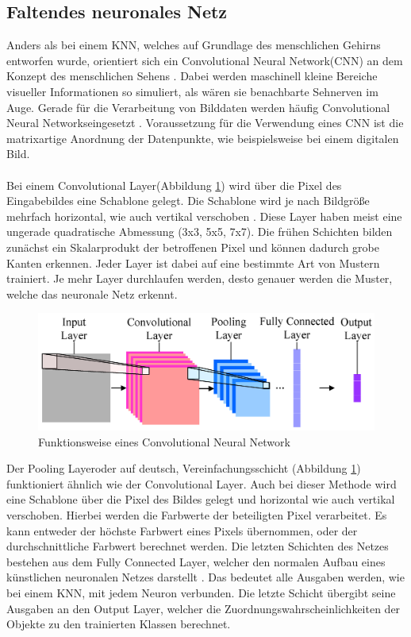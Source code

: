 \documentclass[a4paper,12pt,oneside]{article}
\begin{document}
  \subsection{Faltendes neuronales Netz}
Anders als bei einem KNN, welches auf Grundlage des menschlichen Gehirns entworfen wurde, orientiert sich ein \glqq Convolutional Neural Network\grqq (CNN) an dem Konzept des menschlichen Sehens \cite{lecun1989backpropagation}. Dabei werden maschinell kleine Bereiche visueller Informationen so simuliert, als wären sie benachbarte Sehnerven im Auge. Gerade für die Verarbeitung von Bilddaten werden häufig \glqq Convolutional Neural Networks\grqq eingesetzt \cite[326]{goodfellow2016deep}. Voraussetzung für die Verwendung eines CNN ist die matrixartige Anordnung der Datenpunkte, wie beispielsweise bei einem digitalen Bild.
\\
\\
Bei einem \glqq Convolutional Layer\grqq (Abbildung \ref{img:CNN}) wird über die Pixel des Eingabebildes eine Schablone gelegt. Die Schablone wird je nach Bildgröße mehrfach horizontal, wie auch vertikal verschoben \cite[327-335]{goodfellow2016deep}. Diese Layer haben meist eine ungerade quadratische Abmessung (3x3, 5x5, 7x7). Die frühen Schichten bilden zunächst ein Skalarprodukt der betroffenen Pixel und können dadurch grobe Kanten erkennen. Jeder Layer ist dabei auf eine bestimmte Art von Mustern trainiert. Je mehr Layer durchlaufen werden, desto genauer werden die Muster, welche das neuronale Netz erkennt.

\begin{figure}
    [h]
	\centering
	\includegraphics[scale=1.5]{Sources/cnn2.png}
		\caption{Funktionsweise eines Convolutional Neural Network\cite{info7040061}}
	\label{img:CNN}
\end{figure}

Der \glqq Pooling Layer\grqq oder auf deutsch, Vereinfachungsschicht (Abbildung \ref{img:CNN}) funktioniert ähnlich wie der \glqq Convolutional Layer\grqq \cite[336f.]{goodfellow2016deep}. Auch bei dieser Methode wird eine Schablone über die Pixel des Bildes gelegt und horizontal wie auch vertikal verschoben. Hierbei werden die Farbwerte der beteiligten Pixel verarbeitet. Es kann entweder der höchste Farbwert eines Pixels übernommen, oder der durchschnittliche Farbwert berechnet werden. Die letzten Schichten des Netzes bestehen aus dem \glqq Fully Connected Layer\grqq, welcher den normalen Aufbau eines künstlichen neuronalen Netzes darstellt \cite[14]{lecun1989backpropagation}. Das bedeutet alle Ausgaben werden, wie bei einem KNN, mit jedem Neuron verbunden. Die letzte Schicht übergibt seine Ausgaben an den Output Layer, welcher die Zuordnungswahrscheinlichkeiten der Objekte zu den trainierten Klassen berechnet.
\end{document}
